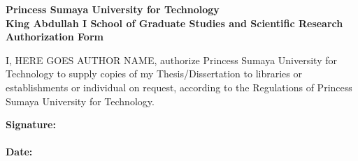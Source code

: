 \begin{center}
\bfseries
\fontsize{14pt}{1em}\selectfont
Princess Sumaya University for Technology\\
King Abdullah I School of Graduate Studies and Scientific Research\\
Authorization Form
\end{center}

\noindent
I, HERE GOES AUTHOR NAME, authorize Princess Sumaya University for
Technology to supply copies of my Thesis/Dissertation to libraries or 
establishments or individual on request, according to the Regulations of 
Princess Sumaya University for Technology.

\noindent
\textbf{Signature:}\\ \\
\textbf{Date:}
